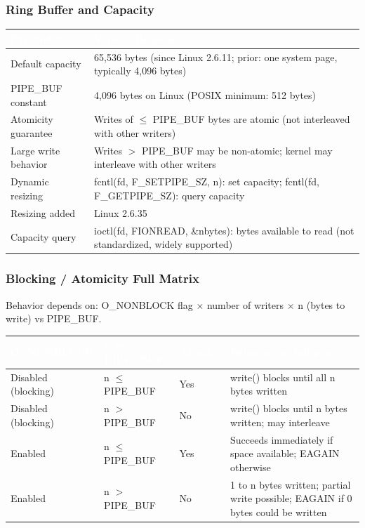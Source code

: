 \documentclass[11pt,letterpaper]{article}
\newcommand{\tableheader}[1]{\textbf{\sffamily\textcolor{white}{#1}}}
\begin{document}
\subsubsection{Ring Buffer and Capacity}

\begin{center}
\begin{tabularx}{\textwidth}{L{3.5cm}X}
\toprule
{}
\tableheader{Parameter} & \tableheader{Value / Behavior} \\
\midrule
Default capacity & 65,536 bytes (since Linux 2.6.11; prior: one system page, typically 4,096 bytes) \\
PIPE\_BUF constant & 4,096 bytes on Linux (POSIX minimum: 512 bytes) \\
Atomicity guarantee & Writes of $\leq$ PIPE\_BUF bytes are atomic (not interleaved with other writers) \\
Large write behavior & Writes $>$ PIPE\_BUF may be non-atomic; kernel may interleave with other writers \\
Dynamic resizing & fcntl(fd, F\_SETPIPE\_SZ, n): set capacity; fcntl(fd, F\_GETPIPE\_SZ): query capacity \\
Resizing added & Linux 2.6.35 \\
Capacity query & ioctl(fd, FIONREAD, \&nbytes): bytes available to read (not standardized, widely supported) \\
\bottomrule
\end{tabularx}
\end{center}

\subsubsection{Blocking / Atomicity Full Matrix}

Behavior depends on: O\_NONBLOCK flag $\times$ number of writers $\times$ n (bytes to write) vs PIPE\_BUF.

\begin{center}
\begin{tabularx}{\textwidth}{L{2.2cm}L{2.2cm}L{2.0cm}X}
\toprule
{}
\tableheader{O\_NONBLOCK} & \tableheader{n vs PIPE\_BUF} & \tableheader{Atomic?} & \tableheader{Behavior on full pipe} \\
\midrule
Disabled (blocking) & n $\leq$ PIPE\_BUF & Yes & write() blocks until all n bytes written \\
Disabled (blocking) & n $>$ PIPE\_BUF & No & write() blocks until n bytes written; may interleave \\
Enabled & n $\leq$ PIPE\_BUF & Yes & Succeeds immediately if space available; EAGAIN otherwise \\
Enabled & n $>$ PIPE\_BUF & No & 1 to n bytes written; partial write possible; EAGAIN if 0 bytes could be written \\
\bottomrule
\end{tabularx}
\end{center}
\end{document}
